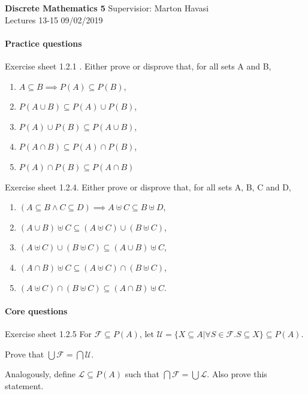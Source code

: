 \documentclass{exam}
\begin{document}
\noindent
\large\textbf{Discrete Mathematics 5} \hfill Supervisior: Marton Havasi \\
\normalsize Lectures 13-15 \hfill 09/02/2019

\paragraph{Practice questions}
\begin{questions}

\question Exercise sheet 1.2.1 . Either prove or disprove that, for all sets A and B,
\begin{enumerate}[label=(\alph*)]
\item $A \subseteq B \implies P(A) \subseteq P(B)$,
\item $P(A \cup B) \subseteq P(A) \cup P(B)$,
\item $P(A) \cup P(B) \subseteq P(A \cup B)$,
\item $P(A \cap B) \subseteq P(A) \cap P(B)$,
\item $P(A) \cap P(B) \subseteq P(A \cap B)$
\end{enumerate} 

\question Exercise sheet 1.2.4. Either prove or disprove that, for all sets A, B, C and D,
\begin{enumerate}[label=(\alph*)]
\item $(A \subseteq B \wedge C \subseteq D) \implies A \uplus C \subseteq B \uplus D$,
\item $(A \cup B) \uplus C \subseteq (A \uplus C) \cup (B \uplus C)$,
\item $(A \uplus C) \cup (B \uplus C) \subseteq (A \cup B) \uplus C$,
\item $(A \cap B) \uplus C \subseteq (A \uplus C) \cap (B \uplus C)$,
\item $(A \uplus C) \cap (B \uplus C) \subseteq (A \cap B) \uplus C$.
\end{enumerate}


\paragraph{Core questions}

\question Exercise sheet 1.2.5 For $\mathcal{F} \subseteq P(A)$, let 
$\mathcal{U}=\{X \subseteq A | \forall S \in \mathcal{F}. S \subseteq X\} \subseteq P(A)$.

 Prove that $\bigcup \mathcal{F} = \bigcap \mathcal{U}$.
 
Analogously, define $\mathcal{L} \subseteq P(A)$ such that $\bigcap \mathcal{F} = \bigcup \mathcal{L}$. Also prove this statement.


\end{questions}
\end{document}
